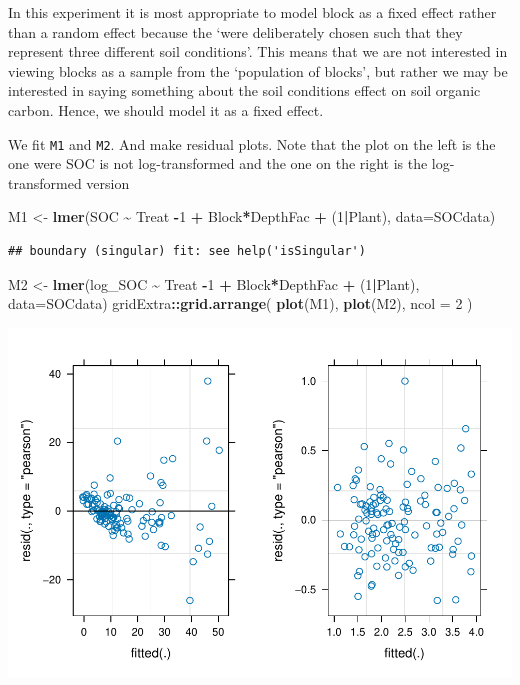 \documentclass[
]{article}
\newenvironment{Shaded}{\begin{snugshade}}{\end{snugshade}}
\newcommand{\AttributeTok}[1]{\textcolor[rgb]{0.13,0.29,0.53}{#1}}
\newcommand{\DecValTok}[1]{\textcolor[rgb]{0.00,0.00,0.81}{#1}}
\newcommand{\FunctionTok}[1]{\textcolor[rgb]{0.13,0.29,0.53}{\textbf{#1}}}
\newcommand{\NormalTok}[1]{#1}
\newcommand{\OtherTok}[1]{\textcolor[rgb]{0.56,0.35,0.01}{#1}}
\newcommand{\SpecialCharTok}[1]{\textcolor[rgb]{0.81,0.36,0.00}{\textbf{#1}}}
\begin{document}
In this experiment it is most appropriate to model block as a fixed
effect rather than a random effect because the `were deliberately chosen
such that they represent three different soil conditions'. This means
that we are not interested in viewing blocks as a sample from the
`population of blocks', but rather we may be interested in saying
something about the soil conditions effect on soil organic carbon.
Hence, we should model it as a fixed effect.

We fit \texttt{M1} and \texttt{M2}. And make residual plots. Note that
the plot on the left is the one were SOC is not log-transformed and the
one on the right is the log-transformed version

\begin{Shaded}
\begin{Highlighting}[]
\NormalTok{M1 }\OtherTok{\textless{}{-}} \FunctionTok{lmer}\NormalTok{(SOC }\SpecialCharTok{\textasciitilde{}}\NormalTok{ Treat }\SpecialCharTok{{-}}\DecValTok{1} \SpecialCharTok{+}\NormalTok{ Block}\SpecialCharTok{*}\NormalTok{DepthFac }\SpecialCharTok{+}\NormalTok{ (}\DecValTok{1}\SpecialCharTok{|}\NormalTok{Plant), }\AttributeTok{data=}\NormalTok{SOCdata)}
\end{Highlighting}
\end{Shaded}

\begin{verbatim}
## boundary (singular) fit: see help('isSingular')
\end{verbatim}

\begin{Shaded}
\begin{Highlighting}[]
\NormalTok{M2 }\OtherTok{\textless{}{-}} \FunctionTok{lmer}\NormalTok{(log\_SOC }\SpecialCharTok{\textasciitilde{}}\NormalTok{ Treat }\SpecialCharTok{{-}}\DecValTok{1} \SpecialCharTok{+}\NormalTok{ Block}\SpecialCharTok{*}\NormalTok{DepthFac }\SpecialCharTok{+}\NormalTok{ (}\DecValTok{1}\SpecialCharTok{|}\NormalTok{Plant), }\AttributeTok{data=}\NormalTok{SOCdata)}
\NormalTok{gridExtra}\SpecialCharTok{::}\FunctionTok{grid.arrange}\NormalTok{(}
  \FunctionTok{plot}\NormalTok{(M1),}
  \FunctionTok{plot}\NormalTok{(M2),}
  \AttributeTok{ncol =} \DecValTok{2}
\NormalTok{)}
\end{Highlighting}
\end{Shaded}

\includegraphics{besvarels_files/figure-latex/unnamed-chunk-4-1.pdf}
\end{document}
